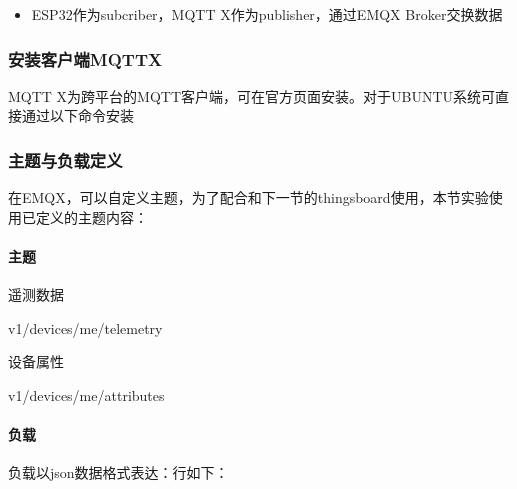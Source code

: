 \documentclass[a4paper,12pt,english]{sphinxmanual}
\begin{document}
{{\begin{itemize}
\item {} 
\sphinxAtStartPar
ESP32作为subcriber，MQTT X作为publisher，通过EMQX Broker交换数据

\end{itemize}


\subsubsection{安装客户端MQTTX}
\label{\detokenize{exp-esp32/mqtt:mqttx}}
\sphinxAtStartPar
MQTT X为跨平台的MQTT客户端，可在官方页面安装。对于UBUNTU系统可直接通过以下命令安装

\begin{sphinxVerbatim}[commandchars=\\\{\}]
   
\end{sphinxVerbatim}


\subsubsection{主题与负载定义}
\label{\detokenize{exp-esp32/mqtt:id5}}
\sphinxAtStartPar
在EMQX，可以自定义主题，为了配合和下一节的thingsboard使用，本节实验使用已定义的主题内容：


\paragraph{主题}
\label{\detokenize{exp-esp32/mqtt:id6}}
 遥测数据

\begin{sphinxVerbatim}[commandchars=\\\{\}]
v1/devices/me/telemetry
\end{sphinxVerbatim}

 设备属性

\begin{sphinxVerbatim}[commandchars=\\\{\}]
v1/devices/me/attributes
\end{sphinxVerbatim}


\paragraph{负载}
\label{\detokenize{exp-esp32/mqtt:id7}}
\sphinxAtStartPar
负载以json数据格式表达：行如下：

\begin{sphinxVerbatim}[commandchars=\\\{\}]
 
\end{sphinxVerbatim}


}}
\end{document}
